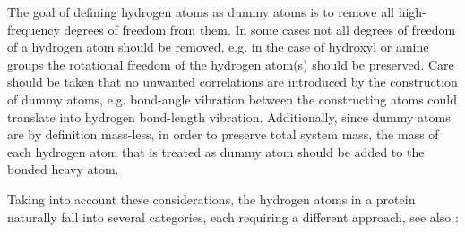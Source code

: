 The goal of defining hydrogen atoms as dummy atoms is to remove all
high-frequency degrees of freedom from them. In some cases not all
degrees of freedom of a hydrogen atom should be removed, e.g. in the
case of hydroxyl or amine groups the rotational freedom of the
hydrogen atom(s) should be preserved. Care should be taken that no
unwanted correlations are introduced by the construction of dummy
atoms, e.g. bond-angle vibration between the constructing atoms could
translate into hydrogen bond-length vibration. Additionally, since
dummy atoms are by definition mass-less, in order to preserve total
system mass, the mass of each hydrogen atom that is treated as dummy
atom should be added to the bonded heavy atom.

Taking into account these considerations, the hydrogen atoms in a
protein naturally fall into several categories, each requiring a
different approach, see also :

